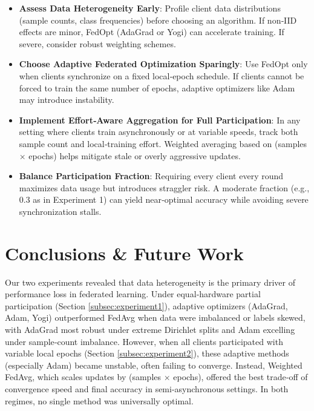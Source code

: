 \documentclass[11pt]{article}
\begin{document}
    \begin{itemize}
        \item \textbf{Assess Data Heterogeneity Early}: Profile client data distributions (sample counts, class frequencies) before choosing an algorithm. If non‐IID effects are minor, FedOpt (AdaGrad or Yogi) can accelerate training. If severe, consider robust weighting schemes.
        \item \textbf{Choose Adaptive Federated Optimization Sparingly}: Use FedOpt only when clients synchronize on a fixed local‐epoch schedule. If clients cannot be forced to train the same number of epochs, adaptive optimizers like Adam may introduce instability.
        \item \textbf{Implement Effort‐Aware Aggregation for Full Participation}: In any setting where clients train asynchronously or at variable speeds, track both sample count and local‐training effort. Weighted averaging based on (samples $\times$ epochs) helps mitigate stale or overly aggressive updates.
        \item \textbf{Balance Participation Fraction}: Requiring every client every round maximizes data usage but introduces straggler risk. A moderate fraction (e.g., 0.3 as in Experiment 1) can yield near‐optimal accuracy while avoiding severe synchronization stalls.
    \end{itemize}


    \section{Conclusions \& Future Work}
    Our two experiments revealed that data heterogeneity is the primary driver of performance loss in federated learning. Under equal‐hardware partial participation (Section \ref{subsec:experiment1}), adaptive optimizers (AdaGrad, Adam, Yogi) outperformed FedAvg when data were imbalanced or labels skewed, with AdaGrad most robust under extreme Dirichlet splits and Adam excelling under sample‐count imbalance. However, when all clients participated with variable local epochs (Section \ref{subsec:experiment2}), these adaptive methods (especially Adam) became unstable, often failing to converge. Instead, Weighted FedAvg, which scales updates by (samples $\times$ epochs), offered the best trade‐off of convergence speed and final accuracy in semi-asynchronous settings. In both regimes, no single method was universally optimal.
\end{document}
